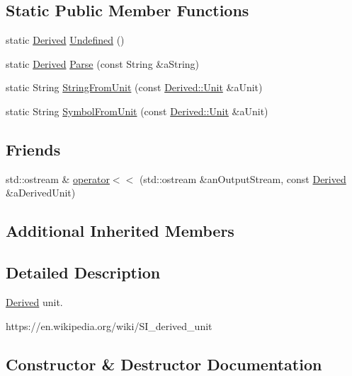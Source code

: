 \subsection*{Static Public Member Functions}
\begin{DoxyCompactItemize}
\item 
static \hyperlink{classostk_1_1physics_1_1units_1_1_derived}{Derived} \hyperlink{classostk_1_1physics_1_1units_1_1_derived_ada49644ef5ef4de36a257fc7b29505ea}{Undefined} ()
\item 
static \hyperlink{classostk_1_1physics_1_1units_1_1_derived}{Derived} \hyperlink{classostk_1_1physics_1_1units_1_1_derived_acc162f19b9d693c4a24098134a2962db}{Parse} (const String \&a\+String)
\item 
static String \hyperlink{classostk_1_1physics_1_1units_1_1_derived_aaa187a7a568772d01109028aca4cd1a1}{String\+From\+Unit} (const \hyperlink{classostk_1_1physics_1_1units_1_1_derived_1_1_unit}{Derived\+::\+Unit} \&a\+Unit)
\item 
static String \hyperlink{classostk_1_1physics_1_1units_1_1_derived_afd7f7eb95f1de5ca792b587ece5ad3c0}{Symbol\+From\+Unit} (const \hyperlink{classostk_1_1physics_1_1units_1_1_derived_1_1_unit}{Derived\+::\+Unit} \&a\+Unit)
\end{DoxyCompactItemize}
\subsection*{Friends}
\begin{DoxyCompactItemize}
\item 
std\+::ostream \& \hyperlink{classostk_1_1physics_1_1units_1_1_derived_a033deb6664987f4b2f86f5abeb18da81}{operator$<$$<$} (std\+::ostream \&an\+Output\+Stream, const \hyperlink{classostk_1_1physics_1_1units_1_1_derived}{Derived} \&a\+Derived\+Unit)
\end{DoxyCompactItemize}
\subsection*{Additional Inherited Members}


\subsection{Detailed Description}
\hyperlink{classostk_1_1physics_1_1units_1_1_derived}{Derived} unit. 

https\+://en.wikipedia.\+org/wiki/\+S\+I\+\_\+derived\+\_\+unit 

\subsection{Constructor \& Destructor Documentation}
\mbox{\label{classostk_1_1physics_1_1units_1_1_derived_aa9d64e31cb0027168041184be11b2302}} 
